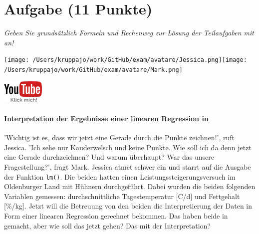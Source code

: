 \documentclass[a4paper, 9pt]{scrartcl}\usepackage[]{graphicx}\usepackage[]{xcolor}
\begin{document}
\section{Aufgabe \hfill (11 Punkte)}

\textit{Geben Sie grundsätzlich Formeln und Rechenweg zur Lösung der Teilaufgaben mit an!} \\[1Ex]
 

 
\begin{minipage}[t]{0.5\textwidth}
\texttt{[image: /Users/kruppajo/work/GitHub/exam/avatare/Jessica.png]}\hspace{-4mm}\texttt{[image: /Users/kruppajo/work/GitHub/exam/avatare/Mark.png]}
\end{minipage}
\begin{minipage}[t]{0.5\textwidth}
\hfill
\href{https://youtu.be/tNNzcndrpSk}{\includegraphics[width = 2cm]{img/youtube}}
\end{minipage}



\paragraph{Interpretation der Ergebnisse einer linearen Regression in \Rlogo}


'Wichtig ist es, dass wir jetzt eine Gerade durch die Punkte zeichnen!', ruft Jessica. 'Ich sehe nur Kauderwelsch und keine Punkte. Wie soll ich da denn jetzt eine Gerade durchzeichnen? Und warum überhaupt? War das unsere Fragestellung?', fragt Mark. Jessica atmet schwer ein und starrt auf die \Rlogo Ausgabe der Funktion \texttt{lm()}. Die beiden hatten einen Leistungssteigerungsversuch im Oldenburger Land mit Hühnern durchgeführt. Dabei wurden die beiden folgenden Variablen gemessen: durchschnittliche Tagestemperatur [C/d] und Fettgehalt [\%/kg]. Jetzt will die Betreuung von den beiden die Interpretierung der Daten in Form einer linearen Regression gerechnet bekommen. Das haben beide in \Rlogo gemacht, aber wie soll das jetzt gehen? Das mit der Interpretation?
\end{document}
